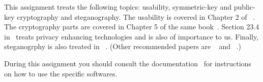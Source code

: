 This assignment treats the following topics: usability, symmetric-key and 
public-key cryptography and steganography.
The usability is covered in Chapter 2 of 
~\cite{Anderson2008sea}.
The cryptography parts are covered in Chapter 5 of the same 
book~\cite{Anderson2008sea}.
Section 23.4 in~\cite{Anderson2008sea} treats privacy enhancing technologies 
and is also of importance to us.
Finally, steganogrphy is also treated in 
~\cite{johnson1998exploring}.
(Other recommended papers are 
~\cite{anderson1998limits} and 
~\cite{provos2003hide}.)

During this assignment you should consult the 
documentation~\cite{gpgdoc,gpg4windoc,outguess,openpuffdoc} for instructions on
how to use the specific softwares.

